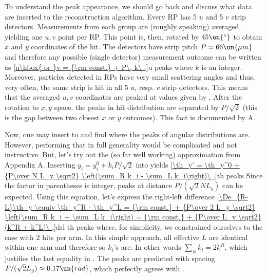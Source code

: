 To understand the peak appearance, we should go back and discuss what data are inserted to the reconstruction algorithm. Every RP has 5 $u$ and 5 $v$ strip detectors. Measurements from each group are (roughly speaking) averaged, yielding one $u, v$ point per RP. This point is, then, rotated by $45\un{^\circ}$ to obtain $x$ and $y$ coordinates of the hit. The detectors have strip pitch $P = 66\un{\mu m}$ and therefore any possible (single detector) measurement outcome can be written as
\eqref{u\hbox{ or }v = {\rm const.} + P\, k\ ,}{u peaks}
where $k$ is an integer. Moreover, particles detected in RPs have very small scattering angles and thus, very often, the same strip is hit in all 5 $u$, resp. $v$ strip detectors. This means that the averaged $u, v$ coordinates are peaked at values given by . After the rotation to $x, y$ space, the peaks in hit distribution are separated by $P/\sqrt{2}$ (this is the gap between two closest $x$ or $y$ outcomes). This fact is documented by A.

Now, one may insert  to  and find where the peaks of angular distributions are. However, performing that in full generality would be complicated and not instructive. But, let's try out the (so far well working) approximation from Appendix A. Inserting $y_i = y^0_i + k_i P / \sqrt2$ into  yields
\eqref{\th_y' = \th_y^0 + {P\over N L_y \sqrt2} \left(\sum_R k_i - \sum_L k_i\right)\ .}{th peaks}
Since the factor in parentheses is integer, peaks at distance $P/(\sqrt2 N L_y)$ can be expected. Using this equation, let's express the right-left difference
\eqref{\De_{R-L}\th_y \equiv \th_y^R - \th_y^L =  {\rm const.} + {P\over 2 L_y \sqrt2} \left(\sum_R k_i + \sum_L k_i\right) = {\rm const.} + {P\over L_y \sqrt2} (k^R + k^L)\ ,}{drl th peaks}
where, for simplicity, we constrained ourselves to the case with 2 hits per arm. In this simple approach, all effective $L$ are identical within one arm and therefore so $k_i$'s are. In other words $\sum_R k_i = 2 k^R$, which justifies the last equality in . The peaks are predicted with spacing $P/(\sqrt2 L_y)\approx 0.17\un{rad}$, which perfectly agrees with .

\emfig

